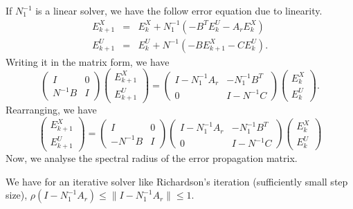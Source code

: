 If $N_1^{-1}$ is a linear solver, we have the follow error equation due to linearity. 
\begin{eqnarray}
 E^X_{k+1} & = & E^X_{k} + N_1^{-1} (-B^T E^U_k - A_r E^X_k) \\
 E_{k+1}^U &=& E_{k}^U + N^{-1} (- B E^X_{k+1} - C E^U_k).
\end{eqnarray}
Writing it in the matrix form, we have 
\begin{equation}
    \begin{pmatrix}
     I & 0\\
     N^{-1} B & I
    \end{pmatrix} 
    \begin{pmatrix}
    E^X_{k+1} \\
    E^U_{k+1}
    \end{pmatrix} 
  = \begin{pmatrix}
    I - N_1^{-1} A_r & - N_1^{-1} B^T \\
    0 & I - N^{-1} C
    \end{pmatrix}
    \begin{pmatrix}
    E^X_{k} \\
    E^U_{k}
    \end{pmatrix}  . 
\end{equation}
Rearranging, we have 
\begin{equation}\begin{pmatrix}
    E^X_{k+1} \\
    E^U_{k+1}
    \end{pmatrix} = 
        \begin{pmatrix}
     I & 0\\
     - N^{-1} B & I
    \end{pmatrix} 
    \begin{pmatrix}
    I - N_1^{-1} A_r & - N_1^{-1} B^T \\
    0 & I - N^{-1} C
    \end{pmatrix}
    \begin{pmatrix}
    E^X_{k} \\
    E^U_{k}
    \end{pmatrix}  
\end{equation}
Now, we analyse the spectral radius of the error propagation matrix. 

We have for an iterative solver like Richardson's iteration (sufficiently small step size), 
$\rho(I - N_1^{-1} A_r) \leq \| I -N_1^{-1} A_r \| \leq 1 $. 

